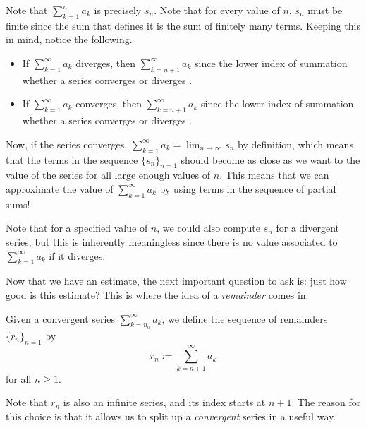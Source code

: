 \documentclass{ximera}
\begin{document}
Note that $\sum_{k=1}^n a_k$ is precisely $s_n$.  Note that for every value of $n$, $s_n$ must be finite since the sum that defines it is the sum of finitely many terms.  Keeping this in mind, notice the following.

\begin{itemize}
\item If $\sum_{k=1}^\infty a_k$ diverges, then $\sum_{k=n+1}^\infty a_k$  since the lower index of summation  whether a series converges or diverges .
\item If $\sum_{k=1}^\infty a_k$ converges, then $\sum_{k=n+1}^\infty a_k$  since the lower index of summation  whether a series converges or diverges .
\end{itemize}

Now, if the series converges, $\sum_{k=1}^\infty a_k  = \lim_{n \to \infty} s_n$ by definition, which means that the terms in the sequence $\{s_n\}_{n=1}$ should become as close as we want to the value of the series for all large enough values of $n$.  This means that we can approximate the value of $\sum_{k=1}^\infty a_k$ by using terms in the sequence of partial sums!  

\begin{remark}
Note that for a specified value of $n$, we could also compute $s_n$ for a divergent series, but this is inherently meaningless since there is no value associated to $\sum_{k=1}^\infty a_k$ if it diverges.
\end{remark}

Now that we have an estimate, the next important question to ask is: just how good is this estimate?  This is where the idea of a \emph{remainder} comes in.

\begin{definition}
Given a convergent series $\sum_{k=n_0}^{\infty} a_k$, we define the sequence of remainders $\{r_n\}_{n=1}$ by 
\[
r_n := \sum_{k=n+1}^{\infty} a_k
\]
for all $n \geq 1$.
\end{definition}

Note that $r_n$ is also an infinite series, and its index starts at $n+1$.  The reason for this choice is that it allows us to split up a \emph{convergent} series in a useful way.  
\end{document}

